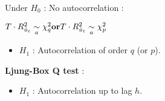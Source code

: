 \begin{f}[Detection]
\begin{itemize}[leftmargin=*]
Under \(H_{0}\) : No autocorrelation :

\begin{center}
\(\hfill T \cdot R^{2}_{\hat{u}_t}\underset{a}{\sim}\chi^{2}_{q} \hfill \textbf{or} \hfill T \cdot R^{2}_{\hat{u}_t}\underset{a}{\sim}\chi^{2}_{p} \hfill\)
\end{center}

\begin{itemize}[leftmargin=*]
\item \(H_{1}\) : Autocorrelation of order \(q\) (or \(p\)).
\end{itemize}

\textbf{Ljung-Box Q test} :

\begin{itemize}[leftmargin=*]
\item \(H_{1}\) : Autocorrelation up to lag \(h\).
\end{itemize}

\end{itemize}



\end{f}  

